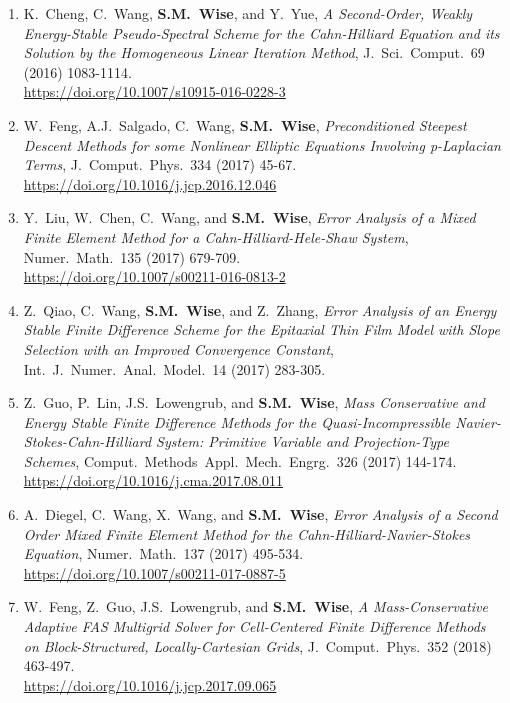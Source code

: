 \documentclass[10pt,letterpaper]{article}
\begin{document}
\begin{enumerate}
	\item
K.~Cheng, C.~Wang, \textbf{S.M.~Wise}, and Y.~Yue, {\sl A Second-Order, Weakly Energy-Stable Pseudo-Spectral Scheme for the Cahn-Hilliard Equation and its Solution by the Homogeneous Linear Iteration Method}, J.~Sci.~Comput.~69 (2016) 1083-1114.
	\\ 
\url{https://doi.org/10.1007/s10915-016-0228-3}

	\item
W.~Feng, A.J.~Salgado, C.~Wang, \textbf{S.M.~Wise}, {\sl Preconditioned Steepest Descent Methods for some Nonlinear Elliptic Equations Involving p-Laplacian Terms}, J.~Comput.~Phys.~334 (2017) 45-67.
	\\ 
\url{https://doi.org/10.1016/j.jcp.2016.12.046}

	\item
Y.~Liu, W.~Chen, C.~Wang, and \textbf{S.M.~Wise}, {\sl Error Analysis of a Mixed Finite Element Method for a Cahn-Hilliard-Hele-Shaw System}, Numer.~Math.~135 (2017) 679-709.
	\\ 
\url{https://doi.org/10.1007/s00211-016-0813-2}

	\item
Z.~Qiao, C.~Wang, \textbf{S.M.~Wise}, and Z.~Zhang, {\sl Error Analysis of an Energy Stable Finite Difference Scheme for the Epitaxial Thin Film Model with Slope Selection with an Improved Convergence Constant}, Int.~J.~Numer.~Anal.~Model.~14 (2017) 283-305.

	\item
Z.~Guo, P.~Lin, J.S.~Lowengrub, and \textbf{S.M.~Wise}, {\sl Mass Conservative and Energy Stable Finite Difference Methods for the Quasi-Incompressible Navier-Stokes-Cahn-Hilliard System: Primitive Variable and Projection-Type Schemes}, Comput.~Methods~Appl.~Mech.~Engrg.~326 (2017) 144-174.
	\\ 
\url{https://doi.org/10.1016/j.cma.2017.08.011}

	\item
A.~Diegel, C.~Wang, X.~Wang, and \textbf{S.M.~Wise}, {\sl Error Analysis of a Second Order Mixed Finite Element Method for the Cahn-Hilliard-Navier-Stokes Equation}, Numer.~Math.~137 (2017) 495-534.
	\\ 
\url{https://doi.org/10.1007/s00211-017-0887-5}

	\item
W.~Feng, Z.~Guo, J.S.~Lowengrub, and \textbf{S.M.~Wise}, {\sl A Mass-Conservative Adaptive FAS Multigrid Solver for Cell-Centered Finite Difference Methods on Block-Structured, Locally-Cartesian Grids}, J.~Comput.~Phys.~352 (2018) 463-497.
	\\ 
\url{https://doi.org/10.1016/j.jcp.2017.09.065}


\end{enumerate}
\end{document}
